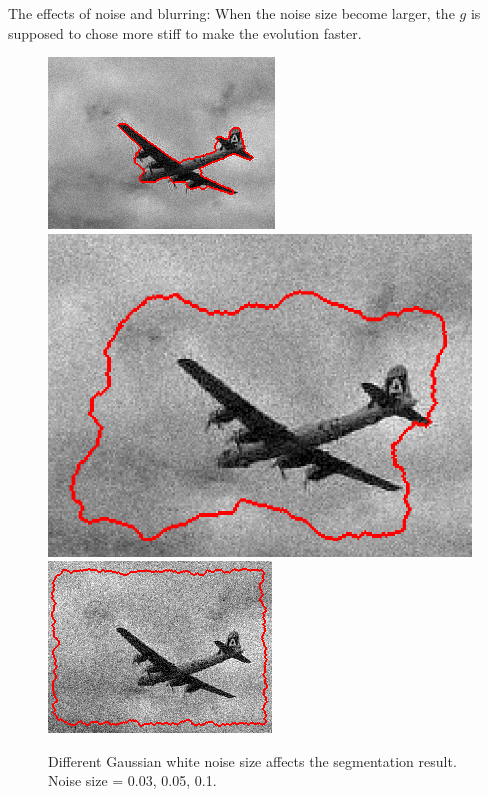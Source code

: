 \documentclass{article}
\begin{document}
The effects of noise and blurring: When the noise size become larger, the $g$ is supposed to chose more stiff to make the evolution faster.
\begin{figure}[H]
\begin{center}
\includegraphics[scale=.8]{sigma03.png}
\includegraphics[scale=.27]{sigma05.png}
\includegraphics[scale=.8]{sigma1.png}
\caption{Different Gaussian white noise size affects the segmentation result. Noise size = 0.03, 0.05, 0.1.}
\end{center}
\end{figure}
\end{document}
